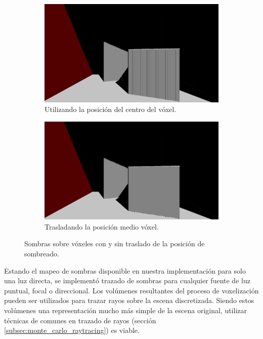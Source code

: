 \begin{figure}[H]
	\centering
	\begin{subfigure}[t]{0.49\textwidth}
		\centering
		\captionsetup{justification=centering}
		\includegraphics[width=\linewidth]{media/no_translation.png}
		\caption*{Utilizando la posición del centro del vóxel.}
	\end{subfigure}%
	\hspace{0.01\textwidth}
	\begin{subfigure}[t]{0.49\textwidth}
		\centering
		\captionsetup{justification=centering}
		\includegraphics[width=\linewidth]{media/with_translation.png}
		\caption*{Trasladando la posición medio vóxel.}
	\end{subfigure}%
	\caption{Sombras sobre vóxeles con y sin traslado de la posición de sombreado.}
	\label{fig:voxel_shadow_translate}
\end{figure}

Estando el mapeo de sombras disponible en nuestra implementación para solo una luz directa, se implementó trazado de sombras para cualquier fuente de luz puntual, focal o direccional. Los volúmenes resultantes del proceso de voxelización pueden ser utilizados para trazar rayos sobre la escena discretizada. Siendo estos volúmenes una representación mucho más simple de la escena original, utilizar técnicas de comunes en trazado de rayos (sección \ref{subsec:monte_carlo_raytracing}) es viable.

